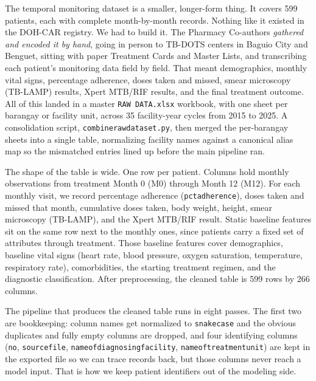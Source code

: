\documentclass[12pt]{article}
\renewcommand{\_}{\textunderscore\allowbreak}
\begin{document}
The temporal monitoring dataset is a smaller, longer-form thing. It covers 599 patients, each with complete month-by-month records. Nothing like it existed in the DOH-CAR registry. We had to build it. The Pharmacy Co-authors \textit{gathered and encoded it by hand}, going in person to TB-DOTS centers in Baguio City and Benguet, sitting with paper Treatment Cards and Master Lists, and transcribing each patient's monitoring data field by field. That meant demographics, monthly vital signs, percentage adherence, doses taken and missed, smear microscopy (TB-LAMP) results, Xpert MTB/RIF results, and the final treatment outcome. All of this landed in a master \texttt{RAW DATA.xlsx} workbook, with one sheet per barangay or facility unit, across 35 facility-year cycles from 2015 to 2025. A consolidation script, \texttt{combine\_raw\_dataset.py}, then merged the per-barangay sheets into a single table, normalizing facility names against a canonical alias map so the mismatched entries lined up before the main pipeline ran.

The shape of the table is wide. One row per patient. Columns hold monthly observations from treatment Month 0 (M0) through Month 12 (M12). For each monthly visit, we record percentage adherence (\texttt{pct\_adherence}), doses taken and missed that month, cumulative doses taken, body weight, height, smear microscopy (TB-LAMP), and the Xpert MTB/RIF result. Static baseline features sit on the same row next to the monthly ones, since patients carry a fixed set of attributes through treatment. Those baseline features cover demographics, baseline vital signs (heart rate, blood pressure, oxygen saturation, temperature, respiratory rate), comorbidities, the starting treatment regimen, and the diagnostic classification. After preprocessing, the cleaned table is 599 rows by 266 columns.

The pipeline that produces the cleaned table runs in eight passes. The first two are bookkeeping: column names get normalized to \texttt{snake\_case} and the obvious duplicates and fully empty columns are dropped, and four identifying columns (\texttt{no}, \texttt{source\_file}, \texttt{name\_of\_diagnosing\_facility}, \texttt{name\_of\_treatment\_unit}) are kept in the exported file so we can trace records back, but those columns never reach a model input. That is how we keep patient identifiers out of the modeling side.
\end{document}

